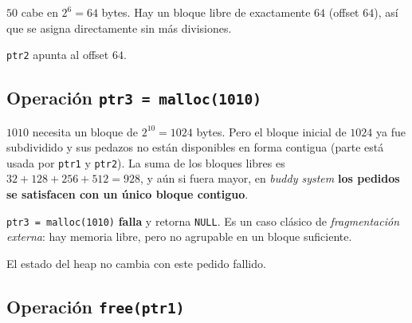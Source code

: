 \documentclass[11pt,a4paper]{article}
\begin{document}
$50$ cabe en $2^6 = 64$ bytes. Hay un bloque libre de exactamente $64$
(offset $64$), así que se asigna directamente sin más divisiones.

\begin{center}
\end{center}

\texttt{ptr2} apunta al offset $64$.

\subsection{Operación \texttt{ptr3 = malloc(1010)}}

$1010$ necesita un bloque de $2^{10} = 1024$ bytes. Pero el bloque
inicial de $1024$ ya fue subdividido y sus pedazos no están
disponibles en forma contigua (parte está usada por \texttt{ptr1} y
\texttt{ptr2}). La suma de los bloques libres es
$32+128+256+512 = 928$, y aún si fuera mayor, en \emph{buddy system}
\textbf{los pedidos se satisfacen con un único bloque contiguo}.

\begin{importante}
\texttt{ptr3 = malloc(1010)} \textbf{falla} y retorna \texttt{NULL}.
Es un caso clásico de \emph{fragmentación externa}: hay memoria libre,
pero no agrupable en un bloque suficiente.
\end{importante}

El estado del heap no cambia con este pedido fallido.

\subsection{Operación \texttt{free(ptr1)}}
\end{document}
